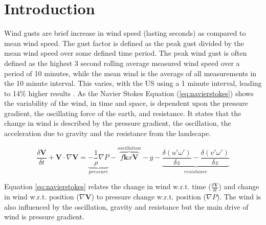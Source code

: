 
\chapter{Introduction} %

\label{Chapter1} %


\newcommand{\keyword}[1]{\textbf{#1}}
\newcommand{\tabhead}[1]{\textbf{#1}}
\newcommand{\code}[1]{\texttt{#1}}
\newcommand{\file}[1]{\texttt{\bfseries#1}}
\newcommand{\option}[1]{\texttt{\itshape#1}}

Wind gusts are brief increase in wind speed (lasting seconds) as compared to mean wind speed. The gust factor is defined as the peak gust divided by the mean wind speed over some defined time period. The peak wind gust is often defined as the highest 3 second rolling average measured wind speed over a period of 10 minutes, while the mean wind is the average of all measurements in the 10 minute interval. This varies, with the US using a 1 minute interval, leading to 14\% higher results \cite{why_wind_gusts}. As the Navier Stokes Equation (\ref{eq:navierstokes}) shows the variability of the wind, in time and space, is dependent upon the pressure gradient, the oscillating force of the earth, and resistance. It states that the change in wind is described by the pressure gradient, the oscillation, the acceleration due to gravity and the resistance from the landscape.

\begin{equation}
    \label{eq:navierstokes}
    \frac{\delta \mathbf{V}}{\delta t} + \mathbf{V}\cdot\nabla\mathbf{V} = \underbrace{-\frac{1}{\rho}\nabla P}_{pressure} -\overbrace{ f\mathbf{k}x\mathbf{V}}^{oscillation} - g - \underbrace{\frac{\delta(u'\omega')}{\delta z} - \frac{\delta(v'\omega')}{\delta z}}_{resistance}
\end{equation}

Equation \ref{eq:navierstokes} relates the change in wind w.r.t. time ($\frac{\delta \boldsymbol{V}}{\delta t}$) and change in wind w.r.t. position ($\nabla\boldsymbol{V}$) to pressure change w.r.t. position ($\nabla P$). The wind is also influenced by the oscillation, gravity and resistance but the main drive of wind is pressure gradient\cite{uncertainties_in_numerical_weather_predictions}.


